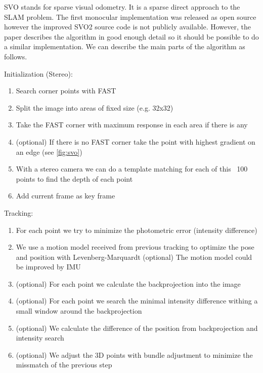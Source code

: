 \documentclass[11pt,a4paper,titlepage,oneside]{report}
\begin{document}
SVO stands for sparse visual odometry. It is a sparse direct approach to the SLAM problem. The first monocular implementation was released as open source however the improved SVO2 source code is not publicly available. However, the paper describes the algorithm in good enough detail so it should be possible to do a similar implementation. We can describe the main parts of the algorithm as follows.

Initialization (Stereo):
\begin{enumerate}
	\item Search corner points with FAST
	\item Split the image into areas of fixed size (e.g. 32x32)
	\item Take the FAST corner with maximum response in each area if there is any
	\item (optional) If there is no FAST corner take the point with highest gradient on an edge (see \ref{fig:svo})
	\item With a stereo camera we can do a template matching for each of this ~100 points to find the depth of each point
	\item Add current frame as key frame
\end{enumerate}

Tracking:
\begin{enumerate}
	\item For each point we try to minimize the photometric error (intensity difference)
	\item We use a motion model received from previous tracking to optimize the pose and position with Levenberg-Marquardt
		\subitem (optional) The motion model could be improved by IMU
	\item (optional) For each point we calculate the backprojection into the image
	\item (optional) For each point we search the minimal intensity difference withing a small window around the backprojection
	\item (optional) We calculate the difference of the position from backprojection and intensity search
	\item (optional) We adjust the 3D points with bundle adjustment to minimize the missmatch of the previous step
\end{enumerate}
\end{document}
